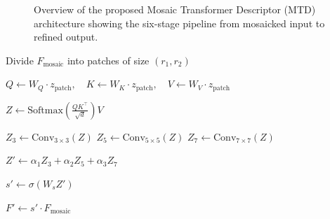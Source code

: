\documentclass[conference]{IEEEtran}
\begin{document}
\begin{figure}[H]
\begin{center}



\caption{Overview of the proposed Mosaic Transformer Descriptor (MTD) architecture showing the six-stage pipeline from mosaicked input to refined output.}
\label{fig:mtd_architecture}
\end{center}
\end{figure}

\begin{algorithm}[!h]
\caption{Mosaic Transformer Descriptor (MTD)}

Divide $F_{\text{mosaic}}$ into patches of size $(r_1, r_2)$\;


$Q \leftarrow W_Q \cdot z_{\text{patch}}, \quad K \leftarrow W_K \cdot z_{\text{patch}}, \quad V \leftarrow W_V \cdot z_{\text{patch}}$\;

$Z \leftarrow \text{Softmax}\left(\frac{QK^\top}{\sqrt{d}}\right) V$\;

$Z_3 \leftarrow \text{Conv}_{3\times3}(Z)$\;
$Z_5 \leftarrow \text{Conv}_{5\times5}(Z)$\;
$Z_7 \leftarrow \text{Conv}_{7\times7}(Z)$\;

$Z' \leftarrow \alpha_1 Z_3 + \alpha_2 Z_5 + \alpha_3 Z_7$\;

$s' \leftarrow \sigma(W_s Z')$\;

$F' \leftarrow s' \cdot F_{\text{mosaic}}$\;

\;

\end{algorithm}
\end{document}
